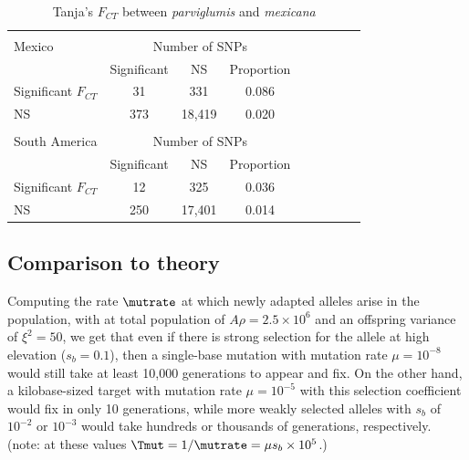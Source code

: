 {{\begin{table}[tb]
\begin{center}
 \caption[]{Tanja's $F_{CT}$ between \emph{parviglumis} and \emph{mexicana}\hspace*{0.3cm}}
  \textbf{}\\[-2mm]
{\fontsize{7}{11}\sf
    \begin{tabular}{lcccccccl} 
    \hline
       & & \\[-3mm]
Mexico     & \multicolumn{3}{c}{Number of SNPs}  \\
                                  & Significant & NS & Proportion  \\
Significant $F_{CT}$ & 31   &   331     & 0.086\\ 
NS                        & 373   &  18,419    & 0.020\\
      \hline
    & & \\[-3mm]
South America     & \multicolumn{3}{c}{Number of SNPs} \\
                                  & Significant & NS & Proportion  \\
Significant $F_{CT}$ & 12   &   325     & 0.036\\ 
NS                                & 250   &  17,401    & 0.014\\[1mm]
    \hline
    \end{tabular}
    \label{tanja}  %
}
\end{center}
\end{table}
\renewcommand{\arraystretch}{1}

\subsection*{Comparison to theory}


Computing the rate $\mutrate$ at which newly adapted alleles arise in the population,
with at total population of $A \rho = 2.5 \times 10^6$ and an offspring variance of $\xi^2 = 50$,
we get that even if there is strong selection for the allele at high elevation ($s_b=0.1$),
then a single-base mutation with mutation rate $\mu=10^{-8}$ would still take at least 10,000 generations to appear and fix.
On the other hand, a kilobase-sized target with mutation rate $\mu=10^{-5}$
with this selection coefficient would fix in only 10 generations,
while more weakly selected alleles with $s_b$ of $10^{-2}$ or $10^{-3}$ would take hundreds or thousands of generations, respectively.
(note: at these values $\Tmut = 1/\mutrate = \mu s_b \times 10^5$.)

}}
